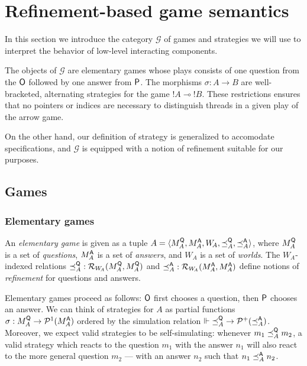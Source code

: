 \section{Refinement-based game semantics}

In this section we introduce the category $\mathcal{G}$ of games and strategies
we will use to interpret the behavior of low-level interacting components.

The objects of $\mathcal{G}$ are elementary games whose plays consists of
one question from the $ \mathsf{O} $ followed by one answer from $ \mathsf{P} $.
The morphisms $\sigma : A \rightarrow B$
are well-bracketed, alternating strategies for the game ${!A} \multimap {!B}$.
These restrictions ensures that no pointers or indices
are necessary to distinguish threads in a given play of the arrow game.

On the other hand,
our definition of strategy is generalized to accomodate specifications,
and $\mathcal{G}$ is equipped with a notion of refinement
suitable for our purposes.

\subsection{Games}

\subsubsection{Elementary games}

\begin{definition}
An \emph{elementary game} is given as a tuple
$A = \langle M_A^{ \mathsf{Q} }, M_A^{ \mathsf{A} }, W_{\!A},
       \preceq_A^{ \mathsf{Q} }, \preceq_A^{ \mathsf{A} } \rangle$, where
$M_A^{ \mathsf{Q} }$ is a set of \emph{questions},
$M_A^{ \mathsf{A} }$ is a set of \emph{answers}, and
$W_{\!A}$ is a set of \emph{worlds}.
The $W_{\!A}$-indexed relations
${\preceq}_A^{ \mathsf{Q} } : \mathcal{R}_{W_{\!A}}(M_A^{ \mathsf{Q} }, M_A^{ \mathsf{Q} })$ and
${\preceq}_A^{ \mathsf{A} } : \mathcal{R}_{W_{\!A}}(M_A^{ \mathsf{A} }, M_A^{ \mathsf{A} })$
define notions of \emph{refinement} for questions and answers.
\end{definition}

Elementary games proceed as follows:
$ \mathsf{O} $ first chooses a question, then
$ \mathsf{P} $ chooses an answer.
We can think of strategies for $A$ as partial functions
$\sigma : M_A^{ \mathsf{Q} } \rightarrow \mathcal{P}^1(M_A^{ \mathsf{A} })$
ordered by the simulation relation
$\Vdash {\preceq}_A^{ \mathsf{Q} } \rightarrow \mathcal{P}^+({\preceq}_A^{ \mathsf{A} })$.
Moreover,
we expect valid strategies to be self-simulating:
whenever $m_1 \preceq_A^{ \mathsf{Q} } m_2$,
a valid strategy which reacts to the question $m_1$
with the answer $n_1$
will also react to the more general question $m_2$ ---
with an answer $n_2$ such that $n_1 \preceq_A^{ \mathsf{A} } n_2$.

